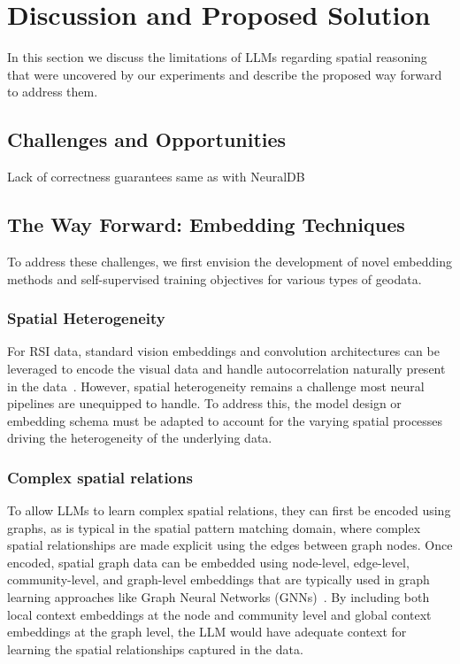 \section{Discussion and Proposed Solution}
\label{section:proposal}

In this section we discuss the limitations of LLMs regarding spatial reasoning that were uncovered by our experiments and describe the proposed way forward to address them.

\subsection{Challenges and Opportunities}



Lack of correctness guarantees same as with NeuralDB

\subsection{The Way Forward: Embedding Techniques}
To address these challenges, we first envision the development of novel embedding methods and self-supervised training objectives for various types of geodata.

\subsubsection{Spatial Heterogeneity} %
For RSI data, standard vision embeddings and convolution architectures can be leveraged to encode the visual data and handle autocorrelation naturally present in the data~\cite{Xie2021}.
However, spatial heterogeneity remains a challenge most neural pipelines are unequipped to handle.
To address this, the model design or embedding schema must be adapted to account for the varying spatial processes driving the heterogeneity of the underlying data.

\subsubsection{Complex spatial relations} %
To allow LLMs to learn complex spatial relations, they can first be encoded using graphs, as is typical in the spatial pattern matching domain, where complex spatial relationships are made explicit using the edges between graph nodes.
Once encoded, spatial graph data can be embedded using node-level, edge-level, community-level, and graph-level embeddings that are typically used in graph learning approaches like Graph Neural Networks (GNNs)~\cite{Bai2019,Krlevza2016,Liu2020Neural}.
By including both local context embeddings at the node and community level and global context embeddings at the graph level, the LLM would have adequate context for learning the spatial relationships captured in the data.

